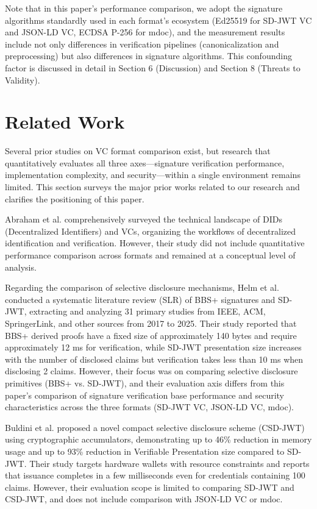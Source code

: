 \documentclass[conference]{IEEEtran}
\begin{document}
Note that in this paper's performance comparison, we adopt the signature algorithms standardly used in each format's ecosystem (Ed25519 for SD-JWT VC and JSON-LD VC, ECDSA P-256 for mdoc), and the measurement results include not only differences in verification pipelines (canonicalization and preprocessing) but also differences in signature algorithms. This confounding factor is discussed in detail in Section 6 (Discussion) and Section 8 (Threats to Validity).

\section{Related Work}

Several prior studies on VC format comparison exist, but research that quantitatively evaluates all three axes---signature verification performance, implementation complexity, and security---within a single environment remains limited. This section surveys the major prior works related to our research and clarifies the positioning of this paper.

Abraham et al. \cite{ref16} comprehensively surveyed the technical landscape of DIDs (Decentralized Identifiers) and VCs, organizing the workflows of decentralized identification and verification. However, their study did not include quantitative performance comparison across formats and remained at a conceptual level of analysis.

Regarding the comparison of selective disclosure mechanisms, Helm et al. \cite{ref17} conducted a systematic literature review (SLR) of BBS+ signatures and SD-JWT, extracting and analyzing 31 primary studies from IEEE, ACM, SpringerLink, and other sources from 2017 to 2025. Their study reported that BBS+ derived proofs have a fixed size of approximately 140 bytes and require approximately 12 ms for verification, while SD-JWT presentation size increases with the number of disclosed claims but verification takes less than 10 ms when disclosing 2 claims. However, their focus was on comparing selective disclosure primitives (BBS+ vs. SD-JWT), and their evaluation axis differs from this paper's comparison of signature verification base performance and security characteristics across the three formats (SD-JWT VC, JSON-LD VC, mdoc).

Buldini et al. \cite{ref15} proposed a novel compact selective disclosure scheme (CSD-JWT) using cryptographic accumulators, demonstrating up to 46\% reduction in memory usage and up to 93\% reduction in Verifiable Presentation size compared to SD-JWT. Their study targets hardware wallets with resource constraints and reports that issuance completes in a few milliseconds even for credentials containing 100 claims. However, their evaluation scope is limited to comparing SD-JWT and CSD-JWT, and does not include comparison with JSON-LD VC or mdoc.
\end{document}
